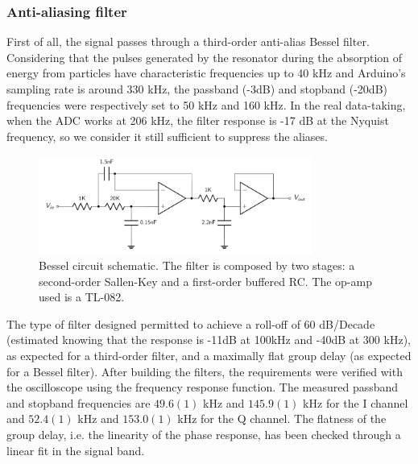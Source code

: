 \documentclass[12pt]{article}
\begin{document}
\subsubsection{Anti-aliasing filter}
First of all, the signal passes through a third-order anti-alias Bessel filter. Considering that the pulses generated by the resonator during the absorption of energy from particles have characteristic frequencies up to 40 kHz and Arduino's sampling rate is around 330 kHz, the passband (-3dB) and stopband (-20dB) frequencies were respectively set to 50 kHz and 160 kHz. In the real data-taking, when the ADC works at 206 kHz, the filter response is -17 dB at the Nyquist frequency, so we consider it still sufficient to suppress the aliases.
    \begin{figure}[H]
        \centering
        \includegraphics[width=0.8\textwidth]{bessel.PNG}
        \caption{Bessel circuit schematic. The filter is composed by two stages: a second-order Sallen-Key and a first-order buffered RC. The op-amp used is a TL-082.}
        \label{bessel}
    \end{figure}
The type of filter designed permitted to achieve a roll-off of 60 dB/Decade (estimated knowing that the response is -11dB at 100kHz and -40dB at 300 kHz), as expected for a third-order filter, and a maximally flat group delay (as expected for a Bessel filter).
After building the filters, the requirements were verified with the oscilloscope using the frequency response function. The measured passband and stopband frequencies are $49.6(1)$ kHz and $145.9(1)$ kHz for the I channel and $52.4(1)$ kHz and $153.0(1)$ kHz for the Q channel. The flatness of the group delay, i.e. the linearity of the phase response, has been checked through a linear fit in the signal band.
\end{document}
